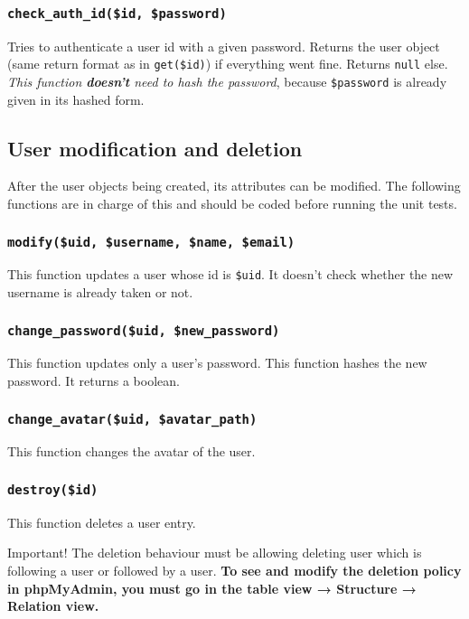 \documentclass[twoside,a4paper,12pt]{article}
\begin{document}
\subsubsection{\texttt{check\_auth\_id(\$id, \$password)}}
Tries to authenticate a user id with a given password. Returns the user object (same return format as in \texttt{get(\$id)}) if everything went fine. Returns \texttt{null} else. \textit{This function \textbf{doesn't} need to hash the password}, because \texttt{\$password} is already given in its hashed form.

\subsection{User modification and deletion}
After the user objects being created, its attributes can be modified. The following functions are in charge of this and should be coded before running the unit tests.

\subsubsection{\texttt{modify(\$uid, \$username, \$name, \$email)}}
This function updates a user whose id is \texttt{\$uid}. It doesn't check whether the new username is already taken or not.


\subsubsection{\texttt{change\_password(\$uid, \$new\_password)}}
This function updates only a user's password. This function hashes the new password. It returns a boolean.

\subsubsection{\texttt{change\_avatar(\$uid, \$avatar\_path)}}
This function changes the avatar of the user.

\subsubsection{\texttt{destroy(\$id)}}
This function deletes a user entry.

\begin{bclogo}[logo=\bcattention, noborder=true, barre=none]{Important!}
	The deletion behaviour must be allowing deleting user which is following a user or followed by a user. \textbf{To see and modify the deletion policy in phpMyAdmin, you must go in the table view → Structure → Relation view.}
		
\end{bclogo}
\end{document}
